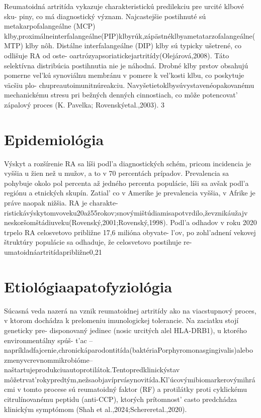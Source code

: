 Reumatoidná artritída vykazuje charakteristickú predilekciu pre urcité klbové sku- piny, co má diagnostický význam. Najcastejšie postihnuté sú metakarpofalangeálne (MCP) klby,proximálneinterfalangeálne(PIP)klbyrúk,zápästnéklbyametatarzofalangeálne(MTP) klby nôh. Distálne interfalangeálne (DIP) klby sú typicky ušetrené, co odlišuje RA od oste- oartrózyapsoriatickejartritídy(Olejárová,2008). Táto selektívna distribúcia postihnutia nie je náhodná. Drobné klby prstov obsahujú pomerne vel’kú synoviálnu membránu v pomere k vel’kosti klbu, co poskytuje väcšiu plo- chupreautoimunitnúreakciu. Navyšetietoklbysúvystavenéopakovanému mechanickému stresu pri bežných denných cinnostiach, co môže potencovat’ zápalový proces (K. Pavelka; Rovenskýetal.,2003). 3


\section{Epidemiológia}

Výskyt a rozšírenie RA sa líši podl’a diagnostických schém, pricom incidencia je vyššia u žien než u mužov, a to v 70 percentách prípadov. Prevalencia sa pohybuje okolo pol percenta až jedného percenta populácie, líši sa avšak podl’a regiónu a etnických skupín. Zatial’ co v Amerike je prevalencia vyššia, v Afrike je práve naopak nižšia. RA je charakte- ristickávýskytomvoveku20až55rokov;snovýmištúdiamisapotvrdilo,ževznikáužajv neskoršomštádiuveku(Rovenský,2001;Rovenský,1998). Podl’a odhadov v roku 2020 trpelo RA celosvetovo približne 17,6 milióna obyvate- l’ov, po zohl’adnení vekovej štruktúry populácie sa odhaduje, že celosvetovo postihuje re- umatoidnáartritídapribližne0,21%


\section{Etiológiaapatofyziológia}

Súcasná veda nazerá na vznik reumatoidnej artritídy ako na viacstupnový proces, v ktorom dochádza k prelomeniu imunologickej tolerancie. Na zaciatku stojí geneticky pre- disponovaný jedinec (nosic urcitých alel HLA-DRB1), u ktorého environmentálny spúš- t’ac --napríkladfajcenie,chronickáparodontitída(baktériaPorphyromonasgingivalis)alebo zmenyvcrevnommikrobióme--naštartujeprodukciuautoprotilátok.Tentopredklinickýstav môžetrvat’rokypredtým,nežsaobjavíprvásynovitída.Kl’úcovýmibiomarkerovýmihrácmi v tomto procese sú reumatoidný faktor (RF) a protilátky proti cyklickému citrulínovanému peptidu (anti-CCP), ktorých prítomnost’ casto predchádza klinickým symptómom (Shah et al.,2024;Schereretal.,2020).


